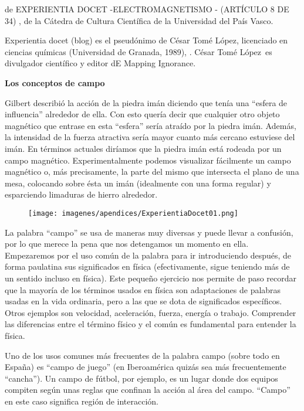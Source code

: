 \noindent \textcolor{gris}{de EXPERIENTIA DOCET -ELECTROMAGNETISMO - (ARTÍCULO 8 DE 34) , de la Cátedra de Cultura Científica de la Universidad del País Vasco.}

\textcolor{gris}{ Experientia docet (blog) es el pseudónimo de César Tomé López,  licenciado en ciencias químicas (Universidad de Granada, 1989), . César Tomé López es divulgador científico y editor dE Mapping Ignorance.}

\vspace{4mm}

\textbf{Los conceptos de campo}

Gilbert describió la acción de la piedra imán diciendo que tenía una “esfera de influencia” alrededor de ella. Con esto quería decir que cualquier otro objeto magnético que entrase en esta “esfera” sería atraído por la piedra imán. Además, la intensidad de la fuerza atractiva sería mayor cuanto más cercano estuviese del imán. En términos actuales diríamos que la piedra imán está rodeada por un campo magnético. Experimentalmente podemos visualizar fácilmente un campo magnético o, más precisamente, la parte del mismo que intersecta el plano de una mesa, colocando sobre ésta un imán (idealmente con una forma regular) y esparciendo limaduras de hierro alrededor.

	\begin{figure}[H]
	\centering
	\texttt{[image: imagenes/apendices/ExperientiaDocet01.png]}
	\end{figure}

La palabra “campo” se usa de maneras muy diversas y puede llevar a confusión, por lo que merece la pena que nos detengamos un momento en ella. Empezaremos por el uso común de la palabra para ir introduciendo después, de forma paulatina sus significados en física (efectivamente, sigue teniendo más de un sentido incluso en física). Este pequeño ejercicio nos permite de paso recordar que la mayoría de los términos usados en física son adaptaciones de palabras usadas en la vida ordinaria, pero a las que se dota de significados específicos. Otros ejemplos son velocidad, aceleración, fuerza, energía o trabajo. Comprender las diferencias entre el término físico y el común es fundamental para entender la física.

Uno de los usos comunes más frecuentes de la palabra campo (sobre todo en España) es “campo de juego” (en Iberoamérica quizás sea más frecuentemente “cancha”). Un campo de fútbol, por ejemplo, es un lugar donde dos equipos compiten según unas reglas que confinan la acción al área del campo. “Campo” en este caso significa región de interacción.

